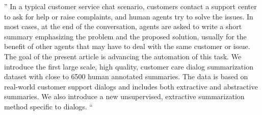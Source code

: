 '' In a typical customer service chat scenario, customers contact a support center to ask for help or raise complaints, and human agents try to solve the issues. In most cases, at the end of the conversation, agents are asked to write a short summary emphasizing the problem and the proposed solution, usually for the benefit of other agents that may have to deal with the same customer or issue. The goal of the present article is advancing the automation of this task. We introduce the first large scale, high quality, customer care dialog summarization dataset with close to 6500 human annotated summaries. The data is based on real-world customer support dialogs and includes both extractive and abstractive summaries. We also introduce a new unsupervised, extractive summarization method specific to dialogs. ``
